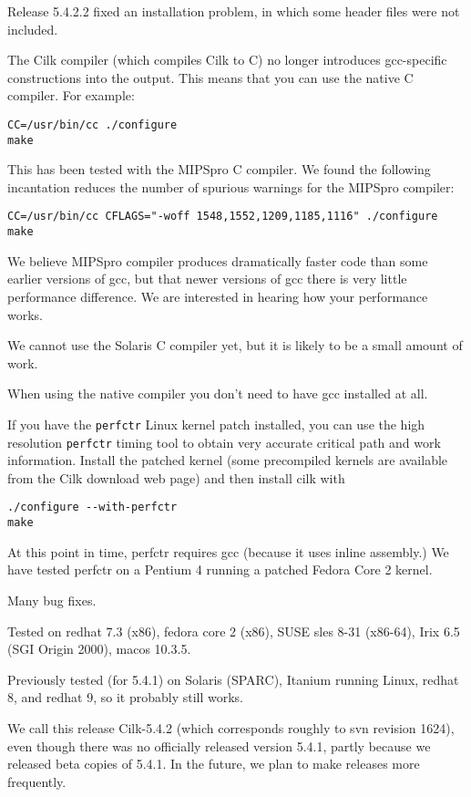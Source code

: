 \begin{closeitemize}
\item Release 5.4.2.2 fixed an installation problem, in which some header files were not included.
\item The Cilk compiler (which compiles Cilk to C) no longer
introduces gcc-specific constructions into the output.  This means
that you can use the native C compiler.  For example:
\begin{verbatim}
CC=/usr/bin/cc ./configure
make
\end{verbatim}
This has been tested with the MIPSpro C compiler.  We found the
following incantation reduces the number of spurious warnings for the
MIPSpro compiler:
\begin{verbatim}
CC=/usr/bin/cc CFLAGS="-woff 1548,1552,1209,1185,1116" ./configure 
make
\end{verbatim}

We believe MIPSpro compiler produces dramatically faster code than
some earlier versions of gcc, but that newer versions of gcc there is
very little performance difference.  We are interested in hearing how
your performance works.

We cannot use the Solaris C compiler yet, but it is likely to be a
small amount of work.

When using the native compiler you don't need to have gcc installed at
all.

\item If you have the \texttt{perfctr} Linux kernel patch installed,
you can use the high resolution \texttt{perfctr} timing tool to obtain
very accurate critical path and work information.  Install the patched
kernel (some precompiled kernels are available from the Cilk download
web page) and then install cilk with
\begin{verbatim}
./configure --with-perfctr
make
\end{verbatim}

At this point in time, perfctr requires gcc (because it uses inline
assembly.)  We have tested perfctr on a Pentium 4 running a patched
Fedora Core 2 kernel.

\item Many bug fixes.
\item Tested on redhat 7.3 (x86), fedora core 2 (x86), SUSE sles 8-31
(x86-64), Irix 6.5 (SGI Origin 2000), macos 10.3.5.

Previously tested (for 5.4.1) on Solaris (SPARC), Itanium running
Linux, redhat 8, and redhat 9, so it probably still works.
\item We call this release Cilk-5.4.2 (which corresponds roughly to
svn revision 1624), even though there was no officially released
version 5.4.1, partly because we released beta copies of 5.4.1.  In
the future, we plan to make releases more frequently.
\end{closeitemize}

